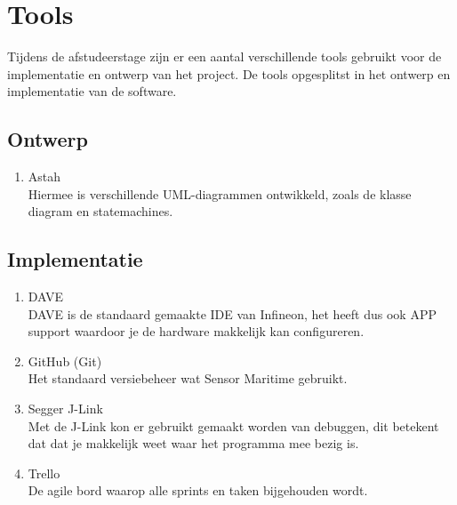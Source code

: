\section{Tools}
Tijdens de afstudeerstage zijn er een aantal verschillende tools gebruikt voor de implementatie en ontwerp van het project. De tools opgesplitst in het ontwerp en implementatie van de software.

\subsection{Ontwerp}
\begin{enumerate}
	\item Astah \\ Hiermee is verschillende UML-diagrammen ontwikkeld, zoals de klasse diagram en statemachines.
\end{enumerate}
\subsection{Implementatie}
\begin{enumerate}
	\item DAVE \\ DAVE is de standaard gemaakte IDE van Infineon, het heeft dus ook APP support waardoor je de hardware makkelijk kan configureren.
	\item GitHub (Git) \\ Het standaard versiebeheer wat Sensor Maritime gebruikt.
	\item Segger J-Link \\ Met de J-Link kon er gebruikt gemaakt worden van debuggen, dit betekent dat dat je makkelijk weet waar het programma mee bezig is.
	\item Trello \\ De agile bord waarop alle sprints en taken bijgehouden wordt.
\end{enumerate}


